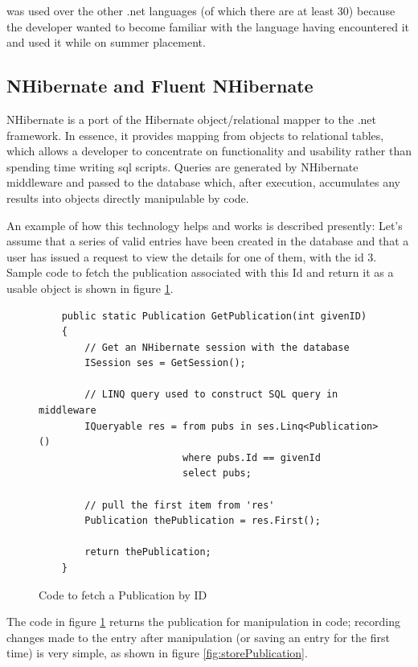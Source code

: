 \cs{} was used over the other .\gls{net} languages (of which there are at least 30) \cite{csUnleashed} because the developer wanted to become familiar with the language having encountered it and used it while on summer placement.

\subsection{NHibernate and Fluent NHibernate}
\label{nhibernate}
NHibernate is a port of the Hibernate object/relational mapper to the .\gls{net} framework. In essence, it provides mapping from objects to relational tables, which allows a developer to concentrate on functionality and usability rather than spending time writing \gls{sql} scripts. Queries are generated by NHibernate middleware and passed to the database which, after execution, accumulates any results into objects directly manipulable by \cs{} code. 

An example of how this technology helps and works is described presently: Let's assume that a series of valid entries have been created in the database and that a user has issued a request to view the details for one of them, with the \gls{id} 3.  Sample code to fetch the publication associated with this Id and return it as a usable object is shown in figure \ref{fig:fetchPubCode}.

\begin{figure}
	\begin{center}
			\lstset{language=CSharp} 
			\begin{lstlisting}
	public static Publication GetPublication(int givenID)
	{
	    // Get an NHibernate session with the database
	    ISession ses = GetSession(); 
	
	   	// LINQ query used to construct SQL query in middleware
	    IQueryable res = from pubs in ses.Linq<Publication>()
	                     where pubs.Id == givenId
	                     select pubs;
	                        
	    // pull the first item from 'res' 
	    Publication thePublication = res.First();
	    
	    return thePublication;
	}
			\end{lstlisting}
		\caption{Code to fetch a Publication by ID}
		\label{fig:fetchPubCode}
	\end{center}
\end{figure}

The code in figure \ref{fig:fetchPubCode} returns the publication for manipulation in code; recording changes made to the entry after manipulation (or saving an entry for the first time) is very simple, as shown in figure \ref{fig:storePublication}.


